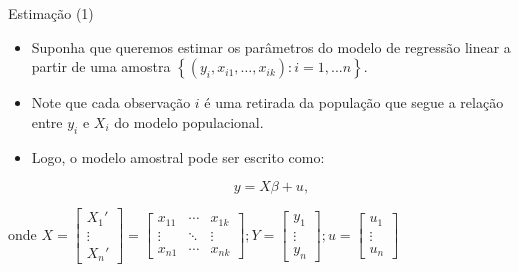 \documentclass[10pt,slides,xcolor=pdftex,dvipsnames,table]{beamer}
\begin{document}
\begin{frame}{Estimação (1)}

    \begin{itemize}\itemsep1.2em
    
      \item Suponha que queremos estimar os parâmetros do modelo de regressão linear a partir de uma amostra $\left\{ (y_i, x_{i1},…, x_{ik}): i=1,...n \right\}$. 
      
      \item Note que cada observação $i$ é uma retirada da população que segue a relação entre $y_i$ e $X_i$ do modelo populacional. 
      
      \item Logo, o modelo amostral pode ser escrito como:
        
        $$ {y = X \beta + u}, $$
        
    \end{itemize}
    \vspace{0.5cm}
        
     onde $ X = \begin{bmatrix} X_{1}' \\ \vdots \\ X_{n}' \end{bmatrix} = \begin{bmatrix} x_{11} & \cdots & x_{1k} \\
\vdots & \ddots & \vdots \\ x_{n1} & \cdots & x_{nk} \end{bmatrix}; Y = \begin{bmatrix}y_{1} \\ \vdots \\ y_{n} \end{bmatrix} ; u = \begin{bmatrix}u_{1} \\ \vdots \\ u_{n} \end{bmatrix} $
    
\end{frame}

    
\end{document}
